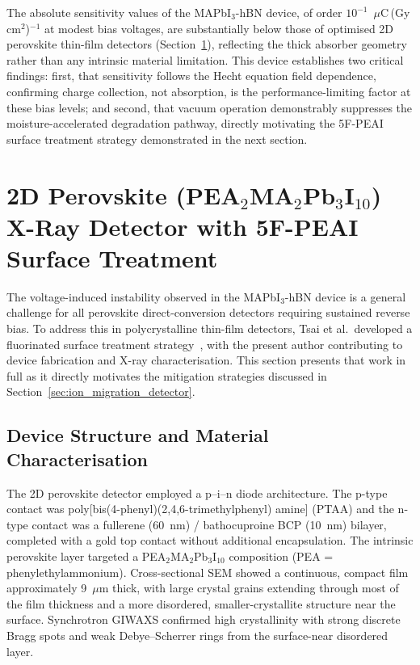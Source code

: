 The absolute sensitivity values of the MAPbI$_3$-hBN device,
of order $10^{-1}$~$\mu$C\,(Gy\,cm$^2$)$^{-1}$ at modest bias
voltages, are substantially below those of optimised 2D
perovskite thin-film detectors (Section~\ref{sec:2d_perovskite_xray}),
reflecting the thick absorber geometry rather than any intrinsic
material limitation.  This device establishes two critical
findings: first, that sensitivity follows the Hecht equation field
dependence, confirming charge collection, not absorption, is
the performance-limiting factor at these bias levels; and second,
that vacuum operation demonstrably suppresses the
moisture-accelerated degradation pathway, directly motivating the
5F-PEAI surface treatment strategy demonstrated in the next
section.


\section{2D Perovskite (PEA$_2$MA$_2$Pb$_3$I$_{10}$) X-Ray
         Detector with 5F-PEAI Surface Treatment}
\label{sec:2d_perovskite_xray}

The voltage-induced instability observed in the MAPbI$_3$-hBN
device is a general challenge for all perovskite direct-conversion
detectors requiring sustained reverse bias.  To address this in
polycrystalline thin-film detectors, Tsai et al.\ developed a
fluorinated surface treatment strategy~\cite{Tsai2022ionmig},
with the present author contributing to device fabrication and
X-ray characterisation.  This section presents that work in full
as it directly motivates the mitigation strategies discussed in
Section~\ref{sec:ion_migration_detector}.

\subsection{Device Structure and Material Characterisation}
\label{sec:2d_device_char}

The 2D perovskite detector employed a p--i--n diode architecture.
The p-type contact was poly[bis(4-phenyl)(2,4,6-trimethylphenyl)
amine] (PTAA) and the n-type contact was a fullerene (60~nm) /
bathocuproine BCP (10~nm) bilayer, completed with a gold top
contact without additional encapsulation.  The intrinsic
perovskite layer targeted a PEA$_2$MA$_2$Pb$_3$I$_{10}$
composition (PEA = phenylethylammonium).  Cross-sectional SEM
showed a continuous, compact film approximately 9~$\mu$m thick,
with large crystal grains extending through most of the film
thickness and a more disordered, smaller-crystallite structure
near the surface.  Synchrotron GIWAXS confirmed high
crystallinity with strong discrete Bragg spots and weak
Debye--Scherrer rings from the surface-near disordered layer.

